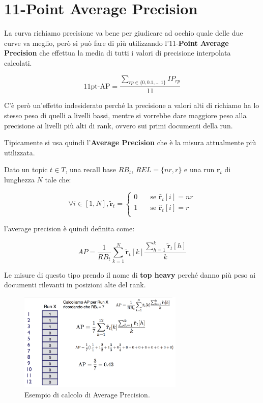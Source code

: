 \FloatBarrier
\section{11-Point Average Precision}

La curva richiamo precisione va bene per giudicare ad occhio quale delle due curve va meglio, però si può fare di più utilizzando l'11-\textbf{Point Average Precision} che effettua la media di tutti i valori di precisione interpolata calcolati.

$$
\text{11pt-AP} = \frac{\sum_{rp\in\{0,0.1,\ldots \ 1 \}}IP_{rp}}{11}
$$

C'è però un'effetto indesiderato perché la precisione a valori alti di richiamo ha lo stesso peso di quelli a livelli bassi, mentre si vorrebbe dare maggiore peso alla precisione ai livelli più alti di rank, ovvero sui primi documenti della run.

Tipicamente si usa quindi l'\textbf{Average Precision} che è la misura attualmente più utilizzata.

Dato un topic $t \in T$, una recall base $RB_t$, $REL =\{ nr, r \}$ e una run $\mathbf{r}_t$ di lunghezza $N$ tale che:

$$
\forall i \in [1, N], \tilde{\mathbf{r}}_t = \begin{cases}
0 \quad &\text{se } \hat{\mathbf{r}}_t[i] = nr \\
1 \quad &\text{se } \hat{\mathbf{r}}_t[i] = r \\
\end{cases}
$$

l'average precision è quindi definita come:

$$
AP = \frac{1}{RB_t}\sum\limits_{k=1}^{N}\tilde{\mathbf{r}}_t[k]\frac{\sum\limits_{h=1}^{k} \tilde{\mathbf{r}}_t[h]}{k}
$$

Le misure di questo tipo prendo il nome di \textbf{top heavy} perché danno più peso ai documenti rilevanti in posizioni alte del rank.

\begin{figure}[htbp]
	\centering
	\includegraphics[width=0.7\textwidth]{images/l15-fig-7.png}
	\caption{Esempio di calcolo di Average Precision.}
\end{figure}

